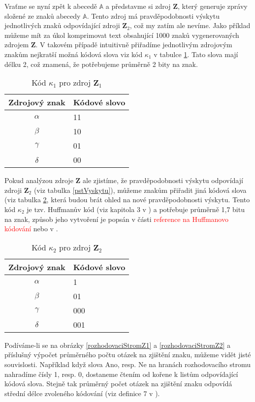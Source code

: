 Vraťme se nyní zpět k abecedě $\mathbb{A}$ a představme si zdroj $\mathbf{Z}$, který generuje zprávy složené ze znaků abecedy $\mathbb{A}$. Tento zdroj má pravděpodobnosti výskytu jednotlivých znaků odpovídající zdroji $\mathbf{Z}_2$, což my zatím ale nevíme. Jako příklad můžeme mít za úkol komprimovat text obsahující 1000 znaků vygenerovaných zdrojem $\mathbf{Z}$. V takovém případě intuitivně přiřadíme jednotlivým zdrojovým znakům nejkratší možná kódová slova viz kód $\kappa_1$ v tabulce \ref{kodovaSlovaZ1}. Tato slova mají délku 2, což znamená, že potřebujeme průměrně 2 bity na znak. 

\begin{table}[!htb]
\centering
\begin{tabular}{|c|l|}
\hline
Zdrojový znak & Kódové slovo\\
\hline
$\alpha$ & 11\\
$\beta$ & 10\\
$\gamma$ & 01\\
$\delta$ & 00\\
\hline
\end{tabular}
\caption{Kód $\kappa_1$ pro zdroj $\mathbf{Z}_1$}
\label{kodovaSlovaZ1}
\end{table}

Pokud analýzou zdroje $\mathbf{Z}$ ale zjistíme, že pravděpodobnosti výskytu odpovídají zdroji $\mathbf{Z}_2$ (viz tabulka \ref{pstVyskytu}), můžeme znakům přiřadit jiná kódová slova (viz tabulka \ref{kodovaSlovaZ2}, která budou brát ohled na nové pravděpodobnosti výskytu. Tento kód $\kappa_2$ je tzv. Huffmanův kód (viz kapitola 3 v \cite{teorieKodovani}) a potřebuje průměrně 1,7 bitu na znak, způsob jeho vytvoření je popsán v části \textcolor{red}{reference na Huffmanovo kódování} nebo v \cite{teorieKodovani}.

\begin{table}[!htb]
\centering
\begin{tabular}{|c|l|}
\hline
Zdrojový znak & Kódové slovo\\
\hline
$\alpha$ & 1\\
$\beta$ & 01\\
$\gamma$ & 000\\
$\delta$ & 001\\
\hline
\end{tabular}
\caption{Kód $\kappa_2$ pro zdroj $\mathbf{Z}_2$}
\label{kodovaSlovaZ2}
\end{table}

Podíváme-li se na obrázky \ref{rozhodovaciStromZ1} a \ref{rozhodovaciStromZ2} a příslušný výpočet průměrného počtu otázek na zjištění znaku, můžeme vidět jisté souvislosti. Například když slova Ano, resp. Ne na hranách rozhodovacího stromu nahradíme čísly 1, resp. 0, dostaneme čtením od kořene k listům odpovídající kódová slova. Stejně tak průměrný počet otázek na zjištění znaku odpovídá střední délce zvoleného kódování (viz definice 7 v \cite{teorieKodovani}).

